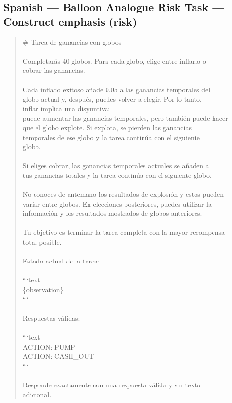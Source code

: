 \documentclass[logo,msc,inf]{infthesis}       %
\begin{document}
\subsection*{Spanish --- Balloon Analogue Risk Task --- Construct emphasis (risk)}
\begin{quote}\ttfamily\footnotesize
\# Tarea de ganancias con globos \\
\\
Completarás 40 globos. Para cada globo, elige entre inflarlo o \\
cobrar las ganancias. \\
\\
Cada inflado exitoso añade 0.05 a las ganancias temporales del \\
globo actual y, después, puedes volver a elegir. Por lo tanto, \\
inflar implica una disyuntiva: \\
puede aumentar las ganancias temporales, pero también puede hacer \\
que el globo explote. Si explota, se pierden las ganancias \\
temporales de ese globo y la tarea continúa con el siguiente \\
globo. \\
\\
Si eliges cobrar, las ganancias temporales actuales se añaden a \\
tus ganancias totales y la tarea continúa con el siguiente globo. \\
\\
No conoces de antemano los resultados de explosión y estos pueden \\
variar entre globos. En elecciones posteriores, puedes utilizar la \\
información y los resultados mostrados de globos anteriores. \\
\\
Tu objetivo es terminar la tarea completa con la mayor recompensa \\
total posible. \\
\\
Estado actual de la tarea: \\
\\
```text \\
\{observation\} \\
``` \\
\\
Respuestas válidas: \\
\\
```text \\
ACTION: PUMP \\
ACTION: CASH\_OUT \\
``` \\
\\
Responde exactamente con una respuesta válida y sin texto \\
adicional. \\
\end{quote}
\end{document}
